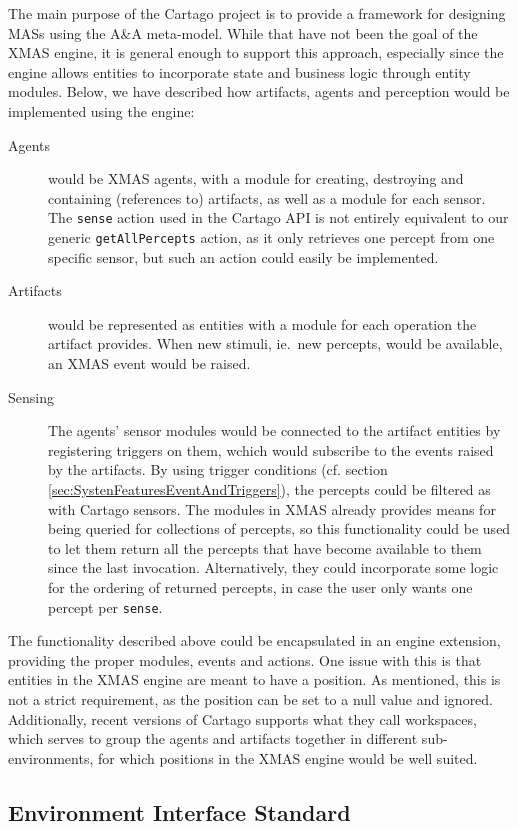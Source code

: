 The main purpose of the Cartago project is to provide a framework
for designing MASs using the A\&A meta-model. While that have not
been the goal of the XMAS engine, it is general enough to support
this approach, especially since the engine allows entities to incorporate
state and business logic through entity modules. Below, we have described
how artifacts, agents and perception would be implemented using the
engine:
\begin{description}
\item [{Agents}] would be XMAS agents, with a module for creating, destroying
and containing (references to) artifacts, as well as a module for
each sensor. The \texttt{sense} action used in the Cartago API is
not entirely equivalent to our generic \texttt{getAllPercepts} action,
as it only retrieves one percept from one specific sensor, but such
an action could easily be implemented. 
\item [{Artifacts}] would be represented as entities with a module for
each operation the artifact provides. When new stimuli, ie.\ new
percepts, would be available, an XMAS event would be raised.
\item [{Sensing}] The agents' sensor modules would be connected to the
artifact entities by registering triggers on them, wchich would subscribe
to the events raised by the artifacts. By using trigger conditions
(cf. section \ref{sec:SystenFeaturesEventAndTriggers}), the percepts
could be filtered as with Cartago sensors. The modules in XMAS already
provides means for being queried for collections of percepts, so this
functionality could be used to let them return all the percepts that
have become available to them since the last invocation. Alternatively,
they could incorporate some logic for the ordering of returned percepts,
in case the user only wants one percept per \texttt{sense}.
\end{description}
The functionality described above could be encapsulated in an engine
extension, providing the proper modules, events and actions. One issue
with this is that entities in the XMAS engine are meant to have a
position. As mentioned, this is not a strict requirement, as the position
can be set to a null value and ignored. Additionally, recent versions
of Cartago supports what they call workspaces, which serves to group
the agents and artifacts together in different sub-environments, for
which positions in the XMAS engine would be well suited.


\subsection{Environment Interface Standard}

